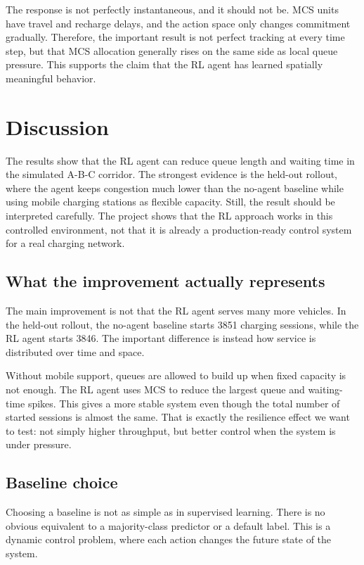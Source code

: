 \documentclass[11pt]{article}
\begin{document}
The response is not perfectly instantaneous, and it should not be. MCS
units have travel and recharge delays, and the action space only changes
commitment gradually. Therefore, the important result is not perfect
tracking at every time step, but that MCS allocation generally rises on
the same side as local queue pressure. This supports the claim that the
RL agent has learned spatially meaningful behavior.

    \hypertarget{toc-discussion}{}
    \section{Discussion}\label{discussion}

The results show that the RL agent can reduce queue length and waiting
time in the simulated A-B-C corridor. The strongest evidence is the
held-out rollout, where the agent keeps congestion much lower than the
no-agent baseline while using mobile charging stations as flexible
capacity. Still, the result should be interpreted carefully. The project
shows that the RL approach works in this controlled environment, not
that it is already a production-ready control system for a real charging
network.

\subsection{What the improvement actually
represents}\label{what-the-improvement-actually-represents}

The main improvement is not that the RL agent serves many more vehicles.
In the held-out rollout, the no-agent baseline starts 3851 charging
sessions, while the RL agent starts 3846. The important difference is
instead how service is distributed over time and space.

Without mobile support, queues are allowed to build up when fixed
capacity is not enough. The RL agent uses MCS to reduce the largest
queue and waiting-time spikes. This gives a more stable system even
though the total number of started sessions is almost the same. That is
exactly the resilience effect we want to test: not simply higher
throughput, but better control when the system is under pressure.

\subsection{Baseline choice}\label{baseline-choice}

Choosing a baseline is not as simple as in supervised learning. There is
no obvious equivalent to a majority-class predictor or a default label.
This is a dynamic control problem, where each action changes the future
state of the system.
\end{document}

